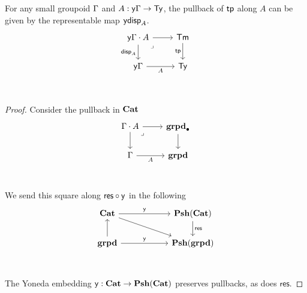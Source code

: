 \begin{cor}
  For any small groupoid $\Gamma$ and $A : \mathsf{y} \Gamma \to \mathsf{Ty}$,
  the pullback of $\mathsf{tp}$ along $A$ can be given by the representable
  map $\mathsf{y} \mathsf{disp}_{A}$.
  \[\begin{tikzcd}
    {\yo \Ga \cdot A} & \Term \\
    {\yo \Ga} & \Type \\
    {}
    \arrow[from=1-1, to=1-2]
    \arrow["{\disp A}"', from=1-1, to=2-1]
    \arrow["\lrcorner"{anchor=center, pos=0.125}, draw=none, from=1-1, to=2-2]
    \arrow["\tp"', from=1-2, to=2-2]
    \arrow["A"', from=2-1, to=2-2]
  \end{tikzcd}\]
\end{cor}
\begin{proof}
  Consider the pullback in $\mathbf{Cat}$
  \[\begin{tikzcd}
    {\Ga \cdot A} & \ptgrpd \\
    \Ga & \grpd \\
    {}
    \arrow[from=1-1, to=1-2]
    \arrow[from=1-1, to=2-1]
    \arrow["\lrcorner"{anchor=center, pos=0.125}, draw=none, from=1-1, to=2-2]
    \arrow[from=1-2, to=2-2]
    \arrow["A"', from=2-1, to=2-2]
  \end{tikzcd}\]
  We send this square along $\textsf{res} \circ \mathsf{y}$ in the following
  \[\begin{tikzcd}
    \Cat && \PshCat \\
    \grpd && \Pshgrpd \\
    & {}
    \arrow["\yo", from=1-1, to=1-3]
    \arrow[from=1-1, to=2-3]
    \arrow["{\textsf{res}}", from=1-3, to=2-3]
    \arrow[from=2-1, to=1-1]
    \arrow["\yo", from=2-1, to=2-3]
  \end{tikzcd}\]
  The Yoneda embedding $\mathsf{y} : \mathbf{Cat} \to \mathbf{Psh}(\mathbf{Cat})$ preserves pullbacks,
  as does $\textsf{res}$.
\end{proof}
